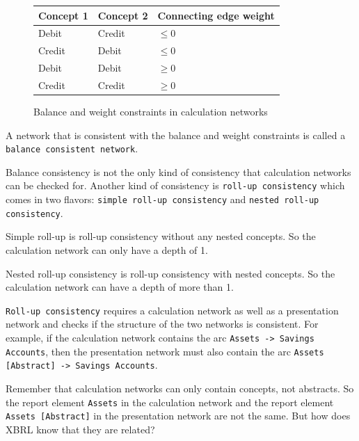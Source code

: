 \begin{figure}[H]
    \label{fig:balance_weight_constraints}
    \centering
    \begin{tabular}{|l|l|l|}
        \hline
        \textbf{Concept 1} & \textbf{Concept 2} & \textbf{Connecting edge weight} \\ \hline
        Debit              & Credit             & $\leq 0$        \\ \hline
        Credit             & Debit              & $\leq 0$        \\ \hline
        Debit              & Debit              & $\geq 0$        \\ \hline
        Credit             & Credit             & $\geq 0$        \\ \hline
    \end{tabular}
    \caption{Balance and weight constraints in calculation networks}
\end{figure}

A network that is consistent with the balance and weight constraints is called a \texttt{balance consistent network}.\cite{fourny2023xbrl}

\label{sec:roll_up_consistency}
Balance consistency is not the only kind of consistency that calculation networks can be checked for.
Another kind of consistency is \texttt{roll-up consistency} which comes in two flavors: \texttt{simple roll-up consistency} and \texttt{nested roll-up consistency}. 

Simple roll-up is roll-up consistency without any nested concepts. 
So the calculation network can only have a depth of 1.

Nested roll-up consistency is roll-up consistency with nested concepts.
So the calculation network can have a depth of more than 1.

\texttt{Roll-up consistency} requires a calculation network as well as a presentation network and checks if the structure of the two networks is consistent.
For example, if the calculation network contains the arc \texttt{Assets -> Savings Accounts}, 
then the presentation network must also contain the arc \texttt{Assets [Abstract] -> Savings Accounts}.

Remember that calculation networks can only contain concepts, not abstracts. 
So the report element \texttt{Assets} in the calculation network and the report element \texttt{Assets [Abstract]} in the presentation network are not the same.
But how does XBRL know that they are related?

